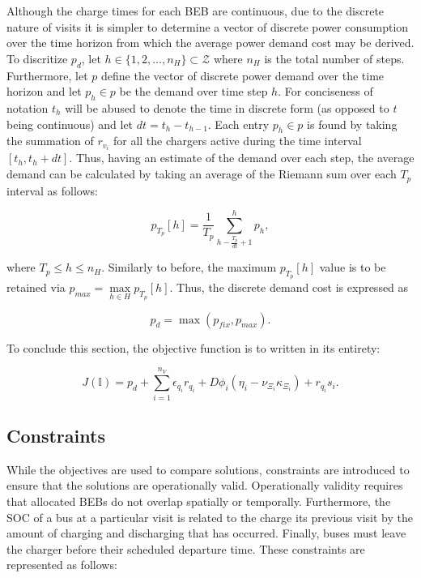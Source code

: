 \documentclass[ee,thesis]{usuthesis}
\newcommand{\I}{\mathbb{I}}                 %
\begin{document}
Although the charge times for each BEB are continuous, due to the discrete nature of visits it is simpler to determine a
vector of discrete power consumption over the time horizon from which the average power demand cost may be derived. To
discritize \(p_d\), let \(h \in \{ 1, 2, ..., n_H \} \subset \mathcal{Z}\) where \(n_H\) is the total number of steps. Furthermore, let \(p\)
define the vector of discrete power demand over the time horizon and let \(p_h \in p\) be the demand over time step \(h\). For
conciseness of notation \(t_h\) will be abused to denote the time in discrete form (as opposed to \(t\) being continuous)
and let \(dt = t_h - t_{h-1}\). Each entry \(p_h \in p\) is found by taking the summation of \(r_{v_i}\) for all the chargers
active during the time interval \([t_h, t_h + dt]\). Thus, having an estimate of the demand over each step, the average
demand can be calculated by taking an average of the Riemann sum over each \(T_p\) interval as follows:

\begin{equation}
p_{T_p}[h] = \frac{1}{T_p} \sum_{h-\frac{T_p}{dt}+1}^h p_h,
\end{equation}

where \(T_p \le h \le n_H\). Similarly to before, the maximum \(p_{T_p}[h]\) value is to be retained via \(p_{max} =
\max\limits_{h \in H}p_{T_p}[h]\). Thus, the discrete demand cost is expressed as

\begin{equation}
\label{eq:pd-dis}
  p_d = \max(p_{fix}, p_{max})\text{.}
\end{equation}

To conclude this section, the objective function is to written in its entirety:

\begin{equation}
\label{eq:objective-function}
  J(\I) = p_d + \sum_{i=1}^{n_V} \epsilon_{q_i}r_{q_i} + D \phi_i(\eta_i - \nu_{\Xi_i} \kappa_{\Xi_i}) + r_{q_i}s_i\text{.}
\end{equation}

\subsection{Constraints}
\label{sec:constraints}
While the objectives are used to compare solutions, constraints are introduced to ensure that the solutions are
operationally valid. Operationally validity requires that allocated BEBs do not overlap spatially or temporally.
Furthermore, the SOC of a bus at a particular visit is related to the charge its previous visit by the amount of
charging and discharging that has occurred. Finally, buses must leave the charger before their scheduled departure time.
These constraints are represented as follows:
\end{document}
